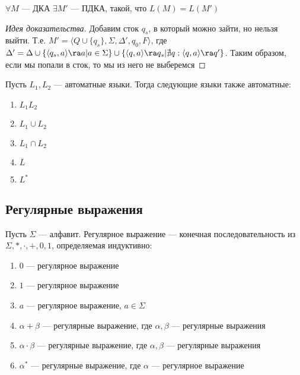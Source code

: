 \begin{proposition}
    \(\forall M\) --- ДКА \(\exists M'\) ---  ПДКА, такой, что \(L(M) = L(M')\)
\end{proposition}
\begin{proof}[Идея доказательства]
    Добавим сток \(q_s\), в который можно зайти, но нельзя выйти. Т.е. \(M' = \langle Q \cup \{q_s\}, \Sigma, \Delta', q_0, F\rangle\), где \(\Delta' = \Delta \cup \{\langle q_s, a \rangle \ra a | a \in \Sigma\} \cup \{\langle q, a \rangle \ra q_s | \nexists q: \langle q, a \rangle \ra q'\}\). Таким образом, если мы попали в сток, то мы из него не выберемся
\end{proof}

\begin{theorem}
    Пусть \(L_1, L_2\) --- автоматные языки. Тогда следующие языки также автоматные:
    \begin{enumerate}
        \item \(L_1L_2\)
        \item \(L_1 \cup L_2\)
        \item \(L_1 \cap L_2\)
        \item \(\overline{L}\)
        \item \(L^*\)
    \end{enumerate}
\end{theorem}

\subsection{Регулярные выражения}
\begin{definition}
    Пусть \(\Sigma\) --- алфавит. Регулярное выражение --- конечная последовательность из \(\Sigma, *, \cdot, +, 0, 1\), определяемая индуктивно:
    \begin{enumerate}
        \item \(0\) --- регулярное выражение 
        \item \(1\) --- регулярное выражение
        \item \(a\) --- регулярное выражение, \(a \in \Sigma\)
        \item \(\alpha + \beta\) --- регулярные выражение, где \(\alpha, \beta\) --- регулярные выражения
        \item \(\alpha \cdot \beta\) --- регулярные выражение, где \(\alpha, \beta\) --- регулярные выражения
        \item \(\alpha^*\) --- регулярные выражение, где \(\alpha\) --- регулярное выражение
    \end{enumerate}
\end{definition}

